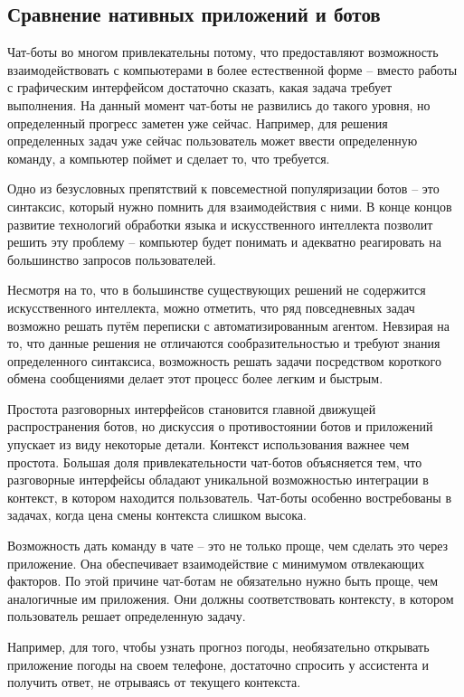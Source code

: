 \subsection{Сравнение нативных приложений и ботов} 
\label{sec:analysis:botsvsnative}

Чат-боты во многом привлекательны потому, что предоставляют возможность взаимодействовать с компьютерами в более естественной форме -- вместо работы с графическим интерфейсом достаточно сказать, какая задача требует выполнения. На данный момент чат-боты не развились до такого уровня, но определенный прогресс заметен уже сейчас. Например, для решения определенных задач уже сейчас пользователь может ввести определенную команду, а компьютер поймет и сделает то, что требуется.

Одно из безусловных препятствий к повсеместной популяризации ботов -- это синтаксис, который нужно помнить для взаимодействия с ними. В конце концов развитие технологий обработки языка и искусственного интеллекта позволит решить эту проблему -- компьютер будет понимать и адекватно реагировать на большинство запросов пользователей.

Несмотря на то, что в большинстве существующих решений не содержится искусственного интеллекта, можно отметить, что ряд повседневных задач возможно решать путём переписки с автоматизированным агентом. Невзирая на то, что данные решения не отличаются сообразительностью и требуют знания определенного синтаксиса, возможность решать задачи посредством короткого обмена сообщениями делает этот процесс более легким и быстрым.

Простота разговорных интерфейсов становится главной движущей распространения ботов, но дискуссия о противостоянии ботов и приложений упускает из виду некоторые детали. Контекст использования важнее чем простота. Большая доля привлекательности чат-ботов объясняется тем, что разговорные интерфейсы обладают уникальной возможностью интеграции в контекст, в котором находится пользователь. Чат-боты особенно востребованы в задачах, когда цена смены контекста слишком высока.

Возможность дать команду в чате -- это не только проще, чем сделать это через приложение. Она обеспечивает взаимодействие с минимумом отвлекающих факторов. По этой причине чат-ботам не обязательно нужно быть проще, чем аналогичные им приложения. Они должны соответствовать контексту, в котором пользователь решает определенную задачу.

Например, для того, чтобы узнать прогноз погоды, необязательно открывать приложение погоды на своем телефоне, достаточно спросить у ассистента и получить ответ, не отрываясь от текущего контекста.

